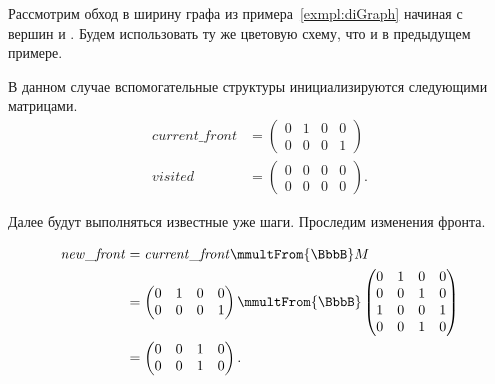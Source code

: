 \begin{example}
    Рассмотрим обход в ширину графа из примера~\ref{exmpl:diGraph} начиная с вершин  и .
    Будем использовать ту же цветовую схему, что и в предыдущем примере.

    В данном случае вспомогательные структуры инициализируются следующими матрицами.
    \begin{align*}
        \mathit{current\_front} & =
        \begin{pmatrix}
            0 & 1 & 0 & 0 \\
            0 & 0 & 0 & 1
        \end{pmatrix}
        \\
        \mathit{visited}        & =
        \begin{pmatrix}
            0 & 0 & 0 & 0 \\
            0 & 0 & 0 & 0
        \end{pmatrix}.
    \end{align*}

    Далее будут выполняться известные уже шаги.
    Проследим изменения фронта.

    \begin{align*}
        \mathit{new\_front} & = \mathit{current\_front} \mmultFrom{\BbbB} M \\
                          &=
        \begin{pmatrix}
            0 & 1 & 0 & 0 \\
            0 & 0 & 0 & 1
        \end{pmatrix} \mmultFrom{\BbbB}
        \begin{pmatrix}
            0 & 1 & 0 & 0 \\
            0 & 0 & 1 & 0 \\
            1 & 0 & 0 & 1 \\
            0 & 0 & 1 & 0
        \end{pmatrix}        \\ &=
        \begin{pmatrix}
            0 & 0 & 1 & 0 \\
            0 & 0 & 1 & 0
        \end{pmatrix}.
    \end{align*}

    \begin{marginfigure}
        \begin{center}
            \resizebox{\marginparwidth}{!}{}
        \end{center}
        \caption{Обход в ширину с несколькими стартовыми вершинами, шаг первый}
        \label{fig:ms_bfs_step_1}
    \end{marginfigure}


\end{example}
